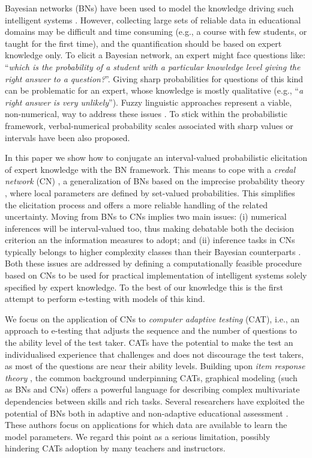\documentclass[runningheads]{llncs}
\begin{document}
	Bayesian networks (BNs) \cite{koller2009} have been used to model the knowledge 
	driving such intelligent systems \cite{almond2015bayesian}. However, collecting large 
	sets of reliable data in educational domains may be difficult and time consuming (e.g., a 
	course with few students, or taught for the first time), and the quantification should be 
	based on expert knowledge only. To elicit a Bayesian network, an expert might face 
	questions like: ``\emph{which is the probability of a student with a particular 
	knowledge level giving the right answer to a question?}''. Giving sharp probabilities for 
	questions of this kind can be problematic for an expert, whose knowledge is mostly 
	qualitative (e.g., ``\emph{a right answer is very unlikely}''). Fuzzy linguistic approaches 
	represent a viable, non-numerical, way to address these issues 
	\cite{badaracco2013fuzzy}. To stick within the probabilistic framework, 
	verbal-numerical probability scales associated with sharp values 
	\cite{renooij1999talking} or intervals \cite{walley1991statistical} have been also 
	proposed.
	
	In this paper we show how to conjugate an interval-valued probabilistic elicitation of 
	expert knowledge with the BN framework. This means to cope with a \emph{credal 
	network} (CN) \cite{novapiatti}, a generalization of BNs based on the imprecise 
	probability theory \cite{walley1991statistical}, where local parameters are defined by 
	set-valued probabilities. This simplifies the elicitation process and offers a more reliable 
	handling of the related uncertainty. Moving from BNs to CNs implies two main issues: 
	(i) numerical inferences will be interval-valued too, thus making debatable both the 
	decision criterion \cite{troffaes} an the information measures \cite{klir1999uncertainty} 
	to adopt; and (ii) inference tasks in CNs typically belongs to higher complexity classes 
	than their Bayesian counterparts \cite{maua14jair}. Both these issues are addressed by 
	defining a computationally feasible procedure based on CNs to be used for practical 
	implementation of intelligent systems solely specified by expert knowledge. To the best 
	of our knowledge this is the first attempt to perform e-testing with models of this kind.
	
	We focus on the application of CNs to \emph{computer adaptive testing} (CAT), i.e., an 
	approach to e-testing that adjusts the sequence and the number of questions to the 
	ability level of the test taker. CATs have the potential to make the test an individualised 
	experience that challenges and does not discourage the test takers, as most of the 
	questions are near their ability levels. Building upon \emph{item response theory} 
	\cite{hambleton1985item}, the common background underpinning CATs, graphical 
	modeling (such as BNs and CNs) offers a powerful language for describing complex 
	multivariate dependencies between skills and rich tasks. Several researchers have 
	exploited the potential of BNs both in adaptive and non-adaptive educational 
	assessment \cite{vomlel2004building,plajner2015}. These authors focus on applications 
	for which data are available to learn the model parameters. We regard this point as a 
	serious limitation, possibly hindering CATs adoption by many teachers and instructors. 
	
\end{document}

